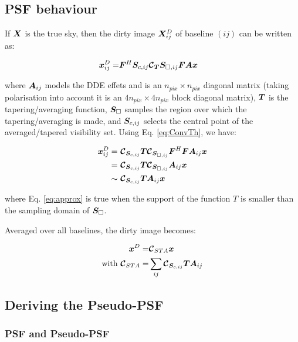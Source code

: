 \newcommand{\roll}[1]{\Delta_l \left\{#1\right\}}


\subsection{PSF behaviour}

If $\bm{X}$ is the true sky, then the dirty image $\bm{X}^D_{ij}$ of
baseline $(ij)$ can be written as:

\begin{alignat}{2}
\bm{x}^D_{ij} =& \bm{F}^H \bm{S}_{c,ij}  \bm{\mathcal{C}}_{\bm{T}} \bm{S}_{\square,ij} \bm{F} \bm{A} \bm{x}
\end{alignat}

\noindent where $\bm{A}_{ij}$ models the DDE effets and is an
$n_{pix}\times n_{pix}$ diagonal matrix (taking polarisation into
account it is an
$4n_{pix}\times 4n_{pix}$ block diagonal matrix), $\bm{T}$ is the tapering/averaging function, 
$\bm{S}_{\square}$ samples the region over which the
tapering/averaging is made, and $\bm{S}_{c,ij}$ selects the central point
of the averaged/tapered visibility set. Using Eq. \ref{eq:ConvTh}, we have:

\begin{alignat}{2}
\bm{x}^D_{ij} =&\ \bm{\mathcal{C}}_{\bm{S}_{c,ij}}  \bm{T} \bm{\mathcal{C}}_{\bm{S}_{\square,ij}}  \bm{F}^H \bm{F} \bm{A}_{ij} \bm{x}\\ 
 =&\  \bm{\mathcal{C}}_{\bm{S}_{c,ij}}  \bm{T} \bm{\mathcal{C}}_{\bm{S}_{\square,ij}}  \bm{A}_{ij}  \bm{x}\\ 
\label{eq:approx}
 \sim&\  \bm{\mathcal{C}}_{\bm{S}_{c,ij}}  \bm{T}    \bm{A}_{ij} \bm{x}
\end{alignat}

\noindent where Eq. \ref{eq:approx} is true when the support of the
function $T$ is smaller than the sampling domain of
$\bm{S}_{\square}$. 

Averaged over all baselines, the dirty image becomes:

\begin{alignat}{2}
\label{eq:PPSF}
\bm{x}^D =&\bm{\mathcal{C}}_{STA} \bm{x}\\
\text{with }\bm{\mathcal{C}}_{STA}=&\sum_{ij}  \bm{\mathcal{C}}_{\bm{S}_{c,ij}}  \bm{T}    \bm{A}_{ij}
\end{alignat}



\subsection{Deriving the Pseudo-PSF}

\subsubsection{PSF and Pseudo-PSF}


